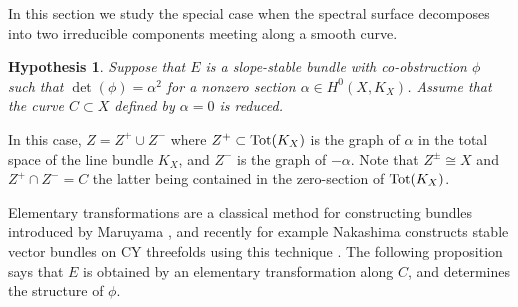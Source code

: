 \documentclass{amsart}
\theoremstyle{plain}
\newtheorem{hypothesis}[theorem]{Hypothesis}
\numberwithin{equation}{section}
\begin{document}
In this section we study the special case when the spectral surface
decomposes into two irreducible components meeting along a smooth curve.

\begin{hypothesis}
\label{squarehyp}
Suppose that $E$ is a slope-stable bundle with co-obstruction $\phi$ such 
that $\det ( \phi ) =\alpha ^2$ for
a nonzero 
section $\alpha \in H^0(X,K_X)$. Assume that the curve $C\subset X$
defined by $\alpha =0$ is reduced.
\end{hypothesis}

In this case, $Z = Z^+\cup Z^-$ where $Z^+\subset {\rm Tot}(K_X)$ is the graph of $\alpha$
in the total space of the line bundle $K_X$, 
and $Z^-$ is the graph of $-\alpha$. Note that $Z^{\pm}\cong X$ and $Z^+\cap Z^- =C$ the latter
being contained in the zero-section of ${\rm Tot}(K_X)$. 

Elementary transformations are a classical method for constructing bundles
introduced by Maruyama \cite{MaruyamaET}
\cite{MaruyamaTransform}, and recently for example
Nakashima constructs stable vector bundles on CY threefolds using this technique
\cite{Nakashima}.
The following proposition says that $E$ is obtained by an elementary transformation along
$C$, and determines the structure of $\phi$. 
\end{document}
